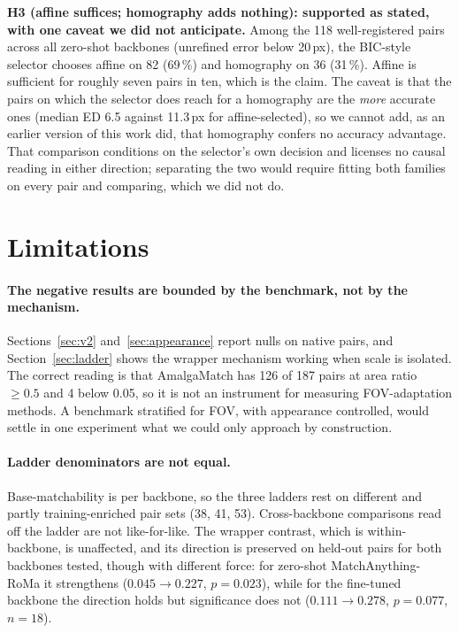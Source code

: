 \documentclass[10pt]{article}
\begin{document}
\textbf{H3 (affine suffices; homography adds nothing): supported as stated, with one caveat we did not anticipate.} Among the 118 well-registered pairs across all zero-shot backbones (unrefined error below 20\,px), the BIC-style selector chooses affine on 82 (69\,\%) and homography on 36 (31\,\%). Affine is sufficient for roughly seven pairs in ten, which is the claim. The caveat is that the pairs on which the selector does reach for a homography are the \emph{more} accurate ones (median ED 6.5 against 11.3\,px for affine-selected), so we cannot add, as an earlier version of this work did, that homography confers no accuracy advantage. That comparison conditions on the selector's own decision and licenses no causal reading in either direction; separating the two would require fitting both families on every pair and comparing, which we did not do.

\section{Limitations}

\paragraph{The negative results are bounded by the benchmark, not by the mechanism.} Sections~\ref{sec:v2} and~\ref{sec:appearance} report nulls on native pairs, and Section~\ref{sec:ladder} shows the wrapper mechanism working when scale is isolated. The correct reading is that AmalgaMatch has 126 of 187 pairs at area ratio ${\ge}0.5$ and 4 below 0.05, so it is not an instrument for measuring FOV-adaptation methods. A benchmark stratified for FOV, with appearance controlled, would settle in one experiment what we could only approach by construction.

\paragraph{Ladder denominators are not equal.} Base-matchability is per backbone, so the three ladders rest on different and partly training-enriched pair sets (38, 41, 53). Cross-backbone comparisons read off the ladder are not like-for-like. The wrapper contrast, which is within-backbone, is unaffected, and its direction is preserved on held-out pairs for both backbones tested, though with different force: for zero-shot MatchAnything-RoMa it strengthens ($0.045\rightarrow0.227$, $p=0.023$), while for the fine-tuned backbone the direction holds but significance does not ($0.111\rightarrow0.278$, $p=0.077$, $n=18$).
\end{document}
